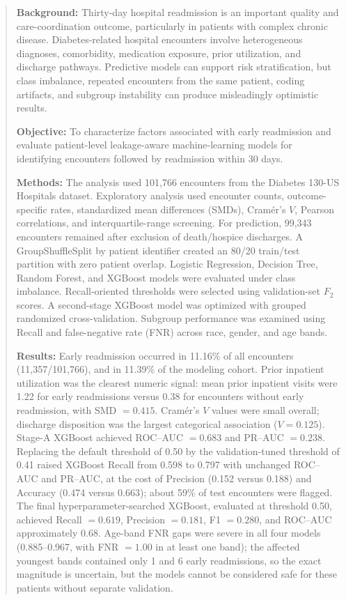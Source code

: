 \documentclass[10pt,a4paper]{article}
\begin{document}
\begin{abstract}
\textbf{Background:} Thirty-day hospital readmission is an important quality and care-coordination outcome, particularly in patients with complex chronic disease. Diabetes-related hospital encounters involve heterogeneous diagnoses, comorbidity, medication exposure, prior utilization, and discharge pathways. Predictive models can support risk stratification, but class imbalance, repeated encounters from the same patient, coding artifacts, and subgroup instability can produce misleadingly optimistic results.

\textbf{Objective:} To characterize factors associated with early readmission and evaluate patient-level leakage-aware machine-learning models for identifying encounters followed by readmission within 30 days.

\textbf{Methods:} The analysis used 101,766 encounters from the Diabetes 130-US Hospitals dataset. Exploratory analysis used encounter counts, outcome-specific rates, standardized mean differences (SMDs), Cramér's $V$, Pearson correlations, and interquartile-range screening. For prediction, 99,343 encounters remained after exclusion of death/hospice discharges. A GroupShuffleSplit by patient identifier created an 80/20 train/test partition with zero patient overlap. Logistic Regression, Decision Tree, Random Forest, and XGBoost models were evaluated under class imbalance. Recall-oriented thresholds were selected using validation-set $F_2$ scores. A second-stage XGBoost model was optimized with grouped randomized cross-validation. Subgroup performance was examined using Recall and false-negative rate (FNR) across race, gender, and age bands.

\textbf{Results:} Early readmission occurred in 11.16\% of all encounters (11,357/101,766), and in 11.39\% of the modeling cohort. Prior inpatient utilization was the clearest numeric signal: mean prior inpatient visits were 1.22 for early readmissions versus 0.38 for encounters without early readmission, with SMD $=0.415$. Cramér's $V$ values were small overall; discharge disposition was the largest categorical association ($V=0.125$). Stage-A XGBoost achieved ROC--AUC $=0.683$ and PR--AUC $=0.238$. Replacing the default threshold of 0.50 by the validation-tuned threshold of 0.41 raised XGBoost Recall from 0.598 to 0.797 with unchanged ROC--AUC and PR--AUC, at the cost of Precision (0.152 versus 0.188) and Accuracy (0.474 versus 0.663); about 59\% of test encounters were flagged. The final hyperparameter-searched XGBoost, evaluated at threshold 0.50, achieved Recall $=0.619$, Precision $=0.181$, F1 $=0.280$, and ROC--AUC approximately 0.68. Age-band FNR gaps were severe in all four models (0.885--0.967, with FNR $=1.00$ in at least one band); the affected youngest bands contained only 1 and 6 early readmissions, so the exact magnitude is uncertain, but the models cannot be considered safe for these patients without separate validation.


\end{abstract}
\end{document}
